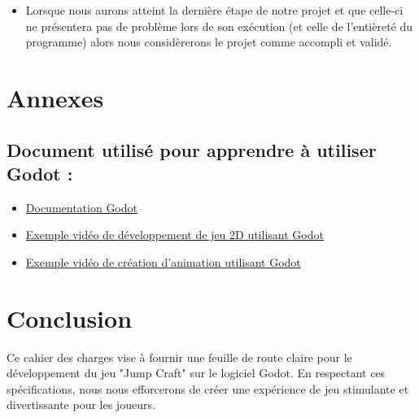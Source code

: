 \documentclass{report}
\begin{document}
\begin{itemize}[label={\textbf{--}}]
    \item Lorsque nous aurons atteint la dernière étape de notre projet et que celle-ci ne présentera pas de problème lors de son exécution (et celle de l’entièreté du programme) alors nous considèrerons le projet comme accompli et validé.
\end{itemize}

\vspace{1cm}

\section{Annexes}

\vspace{0.5cm}

\subsection{Document utilisé pour apprendre à utiliser Godot :}
\begin{itemize}[label={\textbf{--}}]
    \item \href{https://docs.godotengine.org/en/stable/index.html}{Documentation Godot}
    \item \href{https://www.youtube.com/watch?v=S8lMTwSRoRg}{Exemple vidéo de développement de jeu 2D utilisant Godot}
    \item \href{https://www.youtube.com/watch?v=xFEKIWpd0sU}{Exemple vidéo de création d'animation utilisant Godot}
\end{itemize}

\vspace{1cm}

\section{Conclusion}

\vspace{0.5cm}

Ce cahier des charges vise à fournir une feuille de route claire pour le développement du jeu "Jump Craft" sur le logiciel Godot. En respectant ces spécifications, nous nous efforcerons de créer une expérience de jeu stimulante et divertissante pour les joueurs.
\end{document}

